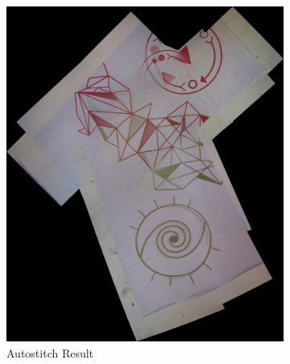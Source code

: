 \begin{figure}
\begin{subfigure}[b]{0.3\textwidth}
\includegraphics[width=\linewidth]{figures/green_red/autostich.jpg}
\caption{Autostitch Result}
\end{subfigure}
\begin{subfigure}[b]{0.3\textwidth}

\end{subfigure}
\end{figure}
